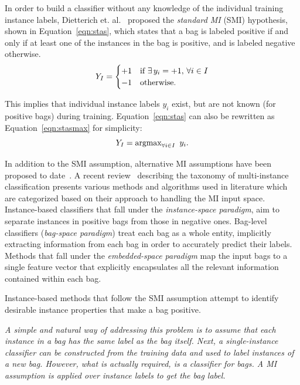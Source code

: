 \documentclass[reqno]{vcuthesis}
\numberwithin{equation}{chapter}
\begin{document}
In order to build a classifier without any knowledge of the individual training instance labels, Dietterich et. al.~\cite{Dietterich1997} proposed the \textit{standard MI} (SMI) hypothesis, shown in Equation~\eqref{eqn:stas}, which states that a bag is labeled positive if and only if at least one of the instances in the bag is positive, and is labeled negative otherwise.
\begin{equation}
\centering \label{eqn:stas}
 Y_I = \begin{cases}
			+1 & \text{if }\exists\, y_i = +1,\, \forall i \in I \\
			-1 & \text{otherwise}.
		  \end{cases}
\end{equation}

This implies that individual instance labels $y_i$ exist, but are not known (for positive bags) during training. Equation~\eqref{eqn:stas} can also be rewritten as Equation~\eqref{eqn:stasmax} for simplicity:
\begin{equation}
\centering \label{eqn:stasmax}
Y_I = \text{argmax}_{\forall i \in I}\,\,\, y_i.
\end{equation}

In addition to the SMI assumption, alternative MI assumptions have been proposed to date~\cite{Foulds2010}. A recent review~\cite{Amores2013} describing the taxonomy of multi-instance classification presents various methods and algorithms used in literature which are categorized based on their approach to handling the MI input space. Instance-based classifiers that fall under the \textit{instance-space paradigm}, aim to separate instances in positive bags from those in negative ones. Bag-level classifiers (\textit{bag-space paradigm}) treat each bag as a whole entity, implicitly extracting information from each bag in order to accurately predict their labels. Methods that fall under the \textit{embedded-space paradigm} map the input bags to a single feature vector that explicitly encapsulates all the relevant information contained within each bag.

Instance-based methods that follow the SMI assumption attempt to identify desirable instance properties that make a bag positive. 

\textit{A simple and natural way of addressing this problem is to assume that each instance in a bag has the same label as the bag itself. Next, a single-instance classifier can be constructed from the training data and used to label instances of a new bag. However, what is actually required, is a classifier for bags. A MI assumption is applied over instance labels to get the bag label.}~\cite{Ventura2016}
\end{document}
